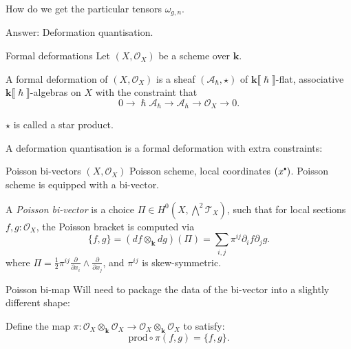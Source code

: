 \frame{\sectionpage}

\begin{frame}
How do we get the particular tensors \(\omega_{g,n}\).

Answer: Deformation quantisation.
\end{frame}


\begin{frame}{Formal deformations}
Let \( (X,\mathcal{O}_X)\) be a scheme over \( \mathbf{k}\).
\vspace{1em}
\begin{defn}
    A formal deformation of \((X,\mathcal{O}_X)\) is a sheaf \( (\mathcal{A}_{\hslash},\star) \) of \( \mathbf{k}\lBrack \hslash \rBrack\)-flat, associative \( \mathbf{k}\lBrack \hslash \rBrack \)-algebras on \(X\) with the constraint that 
    \begin{equation} 
    \label{eqn:def_cons}
    0 \rightarrow \hslash \mathcal{A}_\hslash \rightarrow  \mathcal{A}_{\hslash} \rightarrow \mathcal{O}_X  \rightarrow 0 .
    \end{equation}
\end{defn}
\( \star\) is called a star product.

A deformation quantisation is a formal deformation with extra constraints:
\end{frame}

\begin{frame}{Poisson bi-vectors}
\( (X, \mathcal{O}_X)\) Poisson scheme, local coordinates \( (x^{\sbt}) \). Poisson scheme is equipped with a bi-vector.

\begin{defn}
    A \emph{Poisson bi-vector} is a choice \( \Pi \in   H^0(X,\bigwedge^2 \mathcal{T}_X) \), such that for local sections \( f ,g : \mathcal{O}_X\), the Poisson bracket is computed via
    \begin{equation}
    \label{eqn:bi_vect}    
    \{ f,g\} = (df \otimes_{\mathbf{k}} dg ) ( \Pi) = \sum_{i,j} \pi^{ij} \partial_i f \partial_j g.
    \end{equation}
    where \( \Pi =  \frac{1}{2} \pi^{ij} \frac{\partial}{\partial x_i} \wedge \frac{\partial}{\partial x_j} \), and \( \pi^{ij}\) is skew-symmetric.
\end{defn}
\end{frame} 

\begin{frame}{Poisson bi-map}
    Will need to package the data of the bi-vector into a slightly different shape:
    \begin{defn}
    Define the map \( \pi : \mathcal{O}_X \otimes_{\mathbf{k}} \mathcal{O}_X \rightarrow \mathcal{O}_X \otimes_{\mathbf{k}} \mathcal{O}_X\) to satisfy:  
    \[  \mathrm{prod} \circ \pi (f,g) = \{ f, g\}. \]
    \end{defn}
    
\end{frame}



